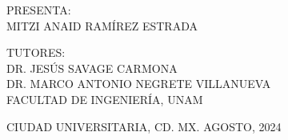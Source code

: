 \begin{center}
\textsc{PRESENTA:}\\
\vspace*{0.2cm}
\textsc{MITZI ANAID RAMÍREZ ESTRADA}\\
\vspace*{1.5cm}

\textsc{TUTORES:}\\
\vspace*{0.2cm}
\textsc{DR. JESÚS SAVAGE CARMONA}\\
\vspace*{0.2cm}
\textsc{DR. MARCO ANTONIO NEGRETE VILLANUEVA}\\
\vspace*{0.2cm}
\textsc{FACULTAD DE INGENIERÍA, UNAM}\\
\vspace*{1cm}

\textsc{CIUDAD UNIVERSITARIA, CD. MX. AGOSTO, 2024}
\end{center}